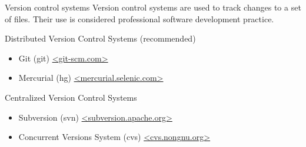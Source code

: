\begin{block}{Version control systems}
  Version control systems are used to track changes to a set of files. Their use is considered professional software development practice.
  \begin{indented_itemize}
  \item Distributed Version Control Systems (recommended)
    \begin{itemize}
    \item Git (git) \url{<git-scm.com>}
    \item Mercurial (hg) \url{<mercurial.selenic.com>}
    \end{itemize}
  \item Centralized Version Control Systems
    \begin{itemize}
    \item Subversion (svn) \url{<subversion.apache.org>}
    \item Concurrent Versions System (cvs) \url{<cvs.nongnu.org>}
    \end{itemize}
  \end{indented_itemize}
\end{block}
